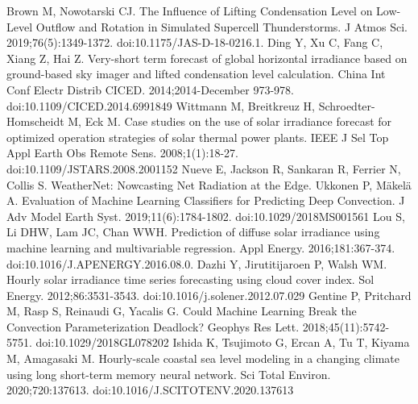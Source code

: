 \documentclass[conference]{IEEEtran}
\begin{document}
\begin{thebibliography}{00}
 Brown M, Nowotarski CJ. The Influence of Lifting Condensation Level on Low-Level Outflow and Rotation in Simulated Supercell Thunderstorms. J Atmos Sci. 2019;76(5):1349-1372. doi:10.1175/JAS-D-18-0216.1.
 Ding Y, Xu C, Fang C, Xiang Z, Hai Z. Very-short term forecast of global horizontal irradiance based on ground-based sky imager and lifted condensation level calculation. China Int Conf Electr Distrib CICED. 2014;2014-December 973-978. doi:10.1109/CICED.2014.6991849
Wittmann M, Breitkreuz H, Schroedter-Homscheidt M, Eck M. Case studies on the use of solar irradiance forecast for optimized operation strategies of solar thermal power plants. IEEE J Sel Top Appl Earth Obs Remote Sens. 2008;1(1):18-27. doi:10.1109/JSTARS.2008.2001152
 Nueve E, Jackson R, Sankaran R, Ferrier N, Collis S. WeatherNet: Nowcasting Net Radiation at the Edge.
 Ukkonen P, Mäkelä A. Evaluation of Machine Learning Classifiers for Predicting Deep Convection. J Adv Model Earth Syst. 2019;11(6):1784-1802. doi:10.1029/2018MS001561
Lou S, Li DHW, Lam JC, Chan WWH. Prediction of diffuse solar irradiance using machine learning and multivariable regression. Appl Energy. 2016;181:367-374. doi:10.1016/J.APENERGY.2016.08.0.
 Dazhi Y, Jirutitijaroen P, Walsh WM. Hourly solar irradiance time series forecasting using cloud cover index. Sol Energy. 2012;86:3531-3543. doi:10.1016/j.solener.2012.07.029
Gentine P, Pritchard M, Rasp S, Reinaudi G, Yacalis G. Could Machine Learning Break the Convection Parameterization Deadlock? Geophys Res Lett. 2018;45(11):5742-5751. doi:10.1029/2018GL078202
Ishida K, Tsujimoto G, Ercan A, Tu T, Kiyama M, Amagasaki M. Hourly-scale coastal sea level modeling in a changing climate using long short-term memory neural network. Sci Total Environ. 2020;720:137613. doi:10.1016/J.SCITOTENV.2020.137613
\end{thebibliography}
\end{document}
